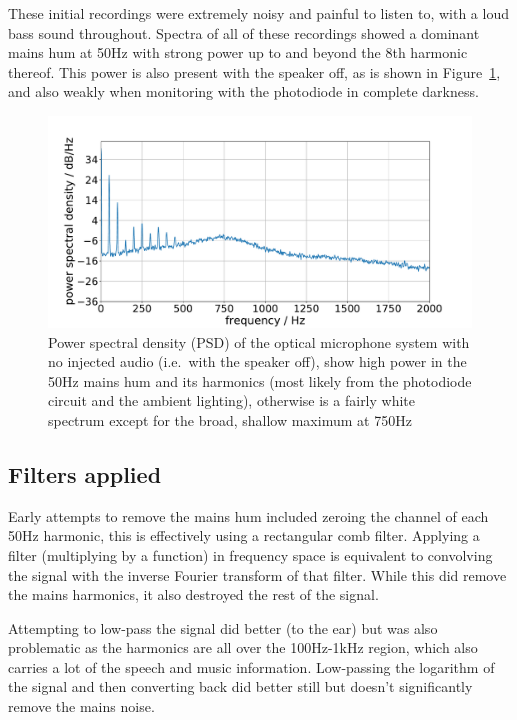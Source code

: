 \documentclass[prb,preprint]{revtex4-1}
\begin{document}
These initial recordings were extremely noisy and painful to listen to, with a loud bass sound throughout. Spectra of all of these recordings showed a dominant mains hum at 50Hz with strong power up to and beyond the 8th harmonic thereof. This power is also present with the speaker off, as is shown in Figure~\ref{fig:psd_noise}, and also weakly when monitoring with the photodiode in complete darkness.

\begin{figure}%
	\includegraphics[width=\textwidth]{figures/podo_noise_psd_zoom-cropped.pdf}
	\caption{Power spectral density (PSD) of the optical microphone system with no injected audio (i.e.\ with the speaker off), show high power in the 50Hz mains hum and its harmonics (most likely from the photodiode circuit and the ambient lighting), otherwise is a fairly white spectrum except for the broad, shallow maximum at 750Hz}
	\label{fig:psd_noise}
\end{figure}

\subsection{Filters applied}

Early attempts to remove the mains hum included zeroing the channel of each 50Hz harmonic, this is effectively using a rectangular comb filter. Applying a filter (multiplying by a function) in frequency space is equivalent to convolving the signal with the inverse Fourier transform of that filter. While this did remove the mains harmonics, it also destroyed the rest of the signal.


Attempting to low-pass the signal did better (to the ear) but was also problematic as the harmonics are all over the 100Hz-1kHz region, which also carries a lot of the speech and music information. Low-passing the logarithm of the signal and then converting back did better still but doesn’t significantly remove the mains noise.
\end{document}
